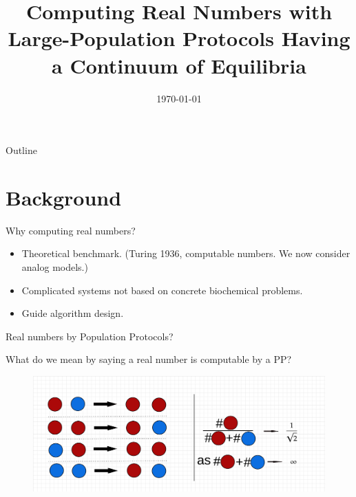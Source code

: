 \documentclass[aspectratio=169]{beamer}
\title[]{Computing Real Numbers with Large-Population Protocols Having a Continuum of Equilibria}
\date[]{\large{\today}}
\author[Xiang\,Huang \& Rachel.\,Huls]
{%
  \texorpdfstring{
    \begin{columns}%
      \column{.45\linewidth}
      \centering
      Xiang Huang\\
      \href{mailto:xhuan5@uis.edu}{(xhuan5@uis.edu)}\\
      \href{https://xianghuang.org}{xianghuang.org}
      \column{.45\linewidth}
      \centering
      Rachel Huls\\
      \href{mailto:rhuls2@uis.edu}{(rhuls2@uis.edu)}
    \end{columns}
  }
  {Xiang Huang \& Rachel Huls}
}
\institute{\Large{University of Illinois Springfield}} %
\begin{document}
\begin{frame}
\maketitle
\end{frame}

\begin{frame}{Outline}
\tableofcontents
\end{frame}

\section{Background}

\begin{frame}{Why computing real numbers?}
\begin{itemize}
    \item Theoretical benchmark. (Turing 1936, computable numbers. We now consider analog models.) \pause
    \item Complicated systems not based on concrete biochemical problems. \pause
    \item Guide algorithm design.
\end{itemize}
\end{frame}

\begin{frame}[Clean]{Real numbers by Population Protocols?}

What do we mean by saying a real number is computable by a PP?

\begin{example}
\begin{figure}[tb]
    \centering
    \includegraphics[scale=0.2]{ppexample1}
\end{figure}
\end{example}
\end{frame}
\end{document}
